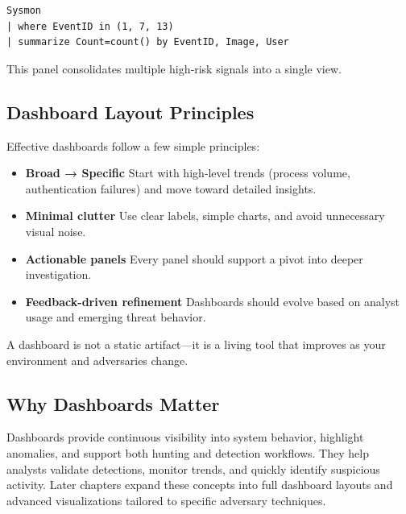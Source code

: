 \begin{lstlisting}
Sysmon
| where EventID in (1, 7, 13)
| summarize Count=count() by EventID, Image, User
\end{lstlisting}

This panel consolidates multiple high‑risk signals into a single view.


\subsection*{Dashboard Layout Principles}

Effective dashboards follow a few simple principles:

\begin{itemize}
    \item \textbf{Broad → Specific}  
    Start with high‑level trends (process volume, authentication failures) and move toward detailed insights.

    \item \textbf{Minimal clutter}  
    Use clear labels, simple charts, and avoid unnecessary visual noise.

    \item \textbf{Actionable panels}  
    Every panel should support a pivot into deeper investigation.

    \item \textbf{Feedback-driven refinement}  
    Dashboards should evolve based on analyst usage and emerging threat behavior.
\end{itemize}

A dashboard is not a static artifact—it is a living tool that improves as your environment and adversaries change.


\subsection*{Why Dashboards Matter}

Dashboards provide continuous visibility into system behavior, highlight anomalies, and support both hunting and 
detection workflows. They help analysts validate detections, monitor trends, and quickly identify suspicious activity. 
Later chapters expand these concepts into full dashboard layouts and advanced visualizations tailored to specific 
adversary techniques.
